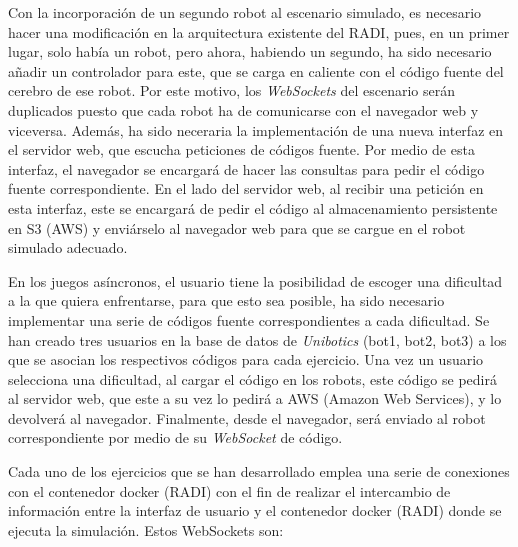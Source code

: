 \documentclass[a4paper, 12pt]{book}
\begin{document}

Con la incorporación de un segundo robot al escenario simulado, es necesario hacer una modificación en la arquitectura existente del RADI, pues, en un primer lugar, solo había un robot, pero ahora, habiendo un segundo, ha sido necesario añadir un controlador para este, que se carga en caliente con el código fuente del cerebro de ese robot. Por este motivo, los \emph{WebSockets} del escenario serán duplicados puesto que cada robot ha de comunicarse con el navegador web y viceversa. Además, ha sido neceraria la implementación de una nueva interfaz en el servidor web, que escucha peticiones de códigos fuente. Por medio de esta interfaz, el navegador se encargará de hacer las consultas para pedir el código fuente correspondiente. En el lado del servidor web, al recibir una petición en esta interfaz, este se encargará de pedir el código al almacenamiento persistente en S3 (AWS) y enviárselo al navegador web para que se cargue en el robot simulado adecuado.


En los juegos asíncronos, el usuario tiene la posibilidad de escoger una dificultad a la que quiera enfrentarse, para que esto sea posible, ha sido necesario implementar una serie de códigos fuente correspondientes a cada dificultad. Se han creado tres usuarios en la base de datos de \emph{Unibotics} (bot1, bot2, bot3) a los que se asocian los respectivos códigos para cada ejercicio. Una vez un usuario selecciona una dificultad, al cargar el código en los robots, este código se pedirá al servidor web, que este a su vez lo pedirá a AWS (Amazon Web Services), y lo devolverá al navegador. Finalmente, desde el navegador, será enviado al robot correspondiente por medio de su \emph{WebSocket} de código.


Cada uno de los ejercicios que se han desarrollado emplea una serie de conexiones con el contenedor docker (RADI) con el fin de realizar el intercambio de información entre la interfaz de usuario y el contenedor docker (RADI) donde se ejecuta la simulación. Estos WebSockets son:
\end{document}
